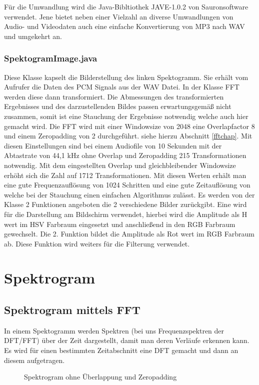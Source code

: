 \documentclass[12pt,a4paper]{article}
\begin{document}
Für die Umwandlung wird die Java-Bibltiothek JAVE-1.0.2 von Sauronsoftware\cite{sauronsoftConverter} verwendet. Jene bietet neben einer Vielzahl an diverse Umwandlungen von Audio- und Videodaten auch eine einfache Konvertierung von MP3 nach WAV und umgekehrt an.

\subsubsection{SpektogramImage.java}
Diese Klasse kapselt die Bilderstellung des linken Spektogramm. Sie erhält vom Aufrufer die Daten des PCM Signals aus der WAV Datei. In der Klasse FFT \cite{fft} werden diese dann transformiert. Die Abmessungen des transformierten Ergebnisses und des darzustellenden Bildes passen erwartungsgemäß nicht zusammen, somit ist eine Stauchung der Ergebnisse notwendig welche auch hier gemacht wird.
Die FFT wird mit einer Windowsize von 2048 eine Overlapfactor 8 und einem Zeropadding von 2 durchgeführt. siehe hierzu Abschnitt \ref{fftchap}. 
Mit diesen Einstellungen sind bei einem Audiofile von 10 Sekunden mit der Abtastrate von 44,1 kHz ohne Overlap und Zeropadding 215 Transformationen notwendig. Mit dem eingestellten Overlap und gleichbleibender Windowsize erhöht sich die Zahl auf 1712  Transformationen.
Mit diesen Werten erhält man eine gute Frequenzauflösung von 1024 Schritten und eine gute Zeitauflösung von welche bei der Stauchung einen einfachen Algorithmus zulässt.
Es werden von der Klasse 2 Funktionen angeboten die 2 verschiedene Bilder zurückgibt. Eine wird für die Darstellung am Bildschirm verwendet, hierbei wird die Amplitude als H wert im HSV Farbraum eingesetzt und anschließend in den RGB Farbraum gewechselt. Die 2. Funktion bildet die Amplitude als Rot wert im RGB Farbraum ab. Diese Funktion wird weiters für die Filterung verwendet.
\section{Spektrogram}
\subsection{Spektrogram mittels FFT}
In einem Spektogramm werden Spektren (bei uns Frequenzspektren der DFT/FFT) über der Zeit dargestellt, damit man deren Verläufe erkennen kann. Es wird für einen bestimmten Zeitabschnitt eine DFT gemacht und dann an diesem aufgetragen.
\begin{figure} [h]%
	\centering
	\label{fig:spekwithoutoverlap} 
	\caption{Spektrogram ohne Überlappung und Zeropadding}
\end{figure}
\end{document}
